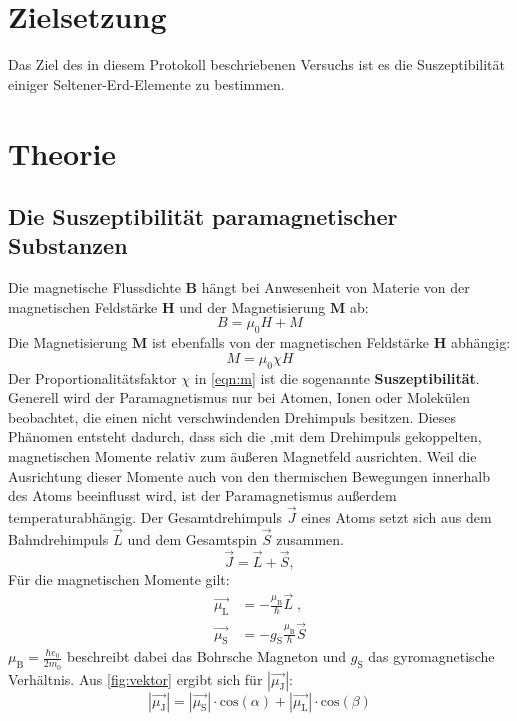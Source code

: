 \section*{Zielsetzung}
\label{sec:Zielsetzung}
Das Ziel des in diesem Protokoll beschriebenen Versuchs ist es die Suszeptibilität einiger Seltener-Erd-Elemente zu bestimmen.
\section{Theorie}
\label{sec:Theorie}
\subsection{Die Suszeptibilität paramagnetischer Substanzen}
Die magnetische Flussdichte $\symbf{B}$ hängt bei Anwesenheit von Materie von der magnetischen Feldstärke $\symbf{H}$ und der Magnetisierung $\symbf{M}$ ab:
    \begin{equation}
        B = \mu_0 H + M
    \label{eqn:b}
    \end{equation}
Die Magnetisierung $\symbf{M}$ ist ebenfalls von der magnetischen Feldstärke $\symbf{H}$ abhängig:
\begin{equation}
    \label{eqn:m}
    M = \mu_0 \chi H 
\end{equation} 
Der Proportionalitätsfaktor $\chi$ in \autoref{eqn:m} ist die sogenannte \textbf{Suszeptibilität}.
Generell wird der Paramagnetismus nur bei Atomen, Ionen oder Molekülen beobachtet, die einen nicht verschwindenden Drehimpuls besitzen. Dieses Phänomen entsteht dadurch, dass sich die ,mit dem Drehimpuls gekoppelten, magnetischen Momente relativ zum äußeren Magnetfeld ausrichten. Weil die Ausrichtung dieser Momente auch von den thermischen Bewegungen innerhalb des Atoms beeinflusst wird, ist der Paramagnetismus außerdem temperaturabhängig.  
Der Gesamtdrehimpuls $\vec{J}$ eines Atoms setzt sich aus dem Bahndrehimpuls $\vec{L}$ und dem Gesamtspin $\vec{S}$ zusammen.
\begin{equation*}
    \vec{J} = \vec{L} + \vec{S} ,
\end{equation*}
Für die magnetischen Momente gilt: 
\begin{align}
    \vec{\mu_\text{L}} &= - \frac{\mu_\text{B}}{\hbar} \vec{L} \; \text{,} \\
    \vec{\mu_\text{S}} &= - g_\text{S} \frac{\mu_\text{B}}{\hbar} \vec{S}
\end{align}
$\mu_\text{B}=\frac{\hbar e_0}{2m_0} $ beschreibt dabei das Bohrsche Magneton und $g_\text{S}$ das
gyromagnetische Verhältnis.
Aus \autoref{fig:vektor} ergibt sich für $|\vec{\mu_\text{J}}|$:
\begin{equation}
    |\vec{\mu_\text{J}}| = |\vec{\mu_\text{S}}| \cdot \text{cos}\left(\alpha \right) + 
    |\vec{\mu_\text{L}}| \cdot \text{cos}\left(\beta \right)
\end{equation}


